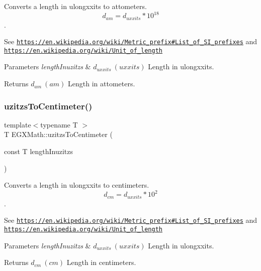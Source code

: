 Converts a length in ulongxxits to attometers. \[ d_{am}=d_{uxxits} * 10^{18} \]. 

See \href{https://en.wikipedia.org/wiki/Metric_prefix#List_of_SI_prefixes}{\tt https\+://en.\+wikipedia.\+org/wiki/\+Metric\+\_\+prefix\#\+List\+\_\+of\+\_\+\+S\+I\+\_\+prefixes} and \href{https://en.wikipedia.org/wiki/Unit_of_length}{\tt https\+://en.\+wikipedia.\+org/wiki/\+Unit\+\_\+of\+\_\+length} 
\begin{DoxyParams}{Parameters}
{\em length\+Inuzitzs} & $ d_{uxxits}\ (uxxits)$ Length in ulongxxits. \\
\hline
\end{DoxyParams}
\begin{DoxyReturn}{Returns}
$ d_{am}\ (am)$ Length in attometers. 
\end{DoxyReturn}
\mbox{\label{group___e_g_x_math-_conversions-_length_conversions-uzitzs-_s_i_ga1fb15b72a000d43348190004a49ed7bc}} 
\subsubsection{\texorpdfstring{uzitzs\+To\+Centimeter()}{uzitzsToCentimeter()}}
{\footnotesize\ttfamily template$<$typename T $>$ \\
T E\+G\+X\+Math\+::uzitzs\+To\+Centimeter (\begin{DoxyParamCaption}\item[{const T}]{length\+Inuzitzs }\end{DoxyParamCaption})}



Converts a length in ulongxxits to centimeters. \[ d_{cm}=d_{uxxits} * 10^{2} \]. 

See \href{https://en.wikipedia.org/wiki/Metric_prefix#List_of_SI_prefixes}{\tt https\+://en.\+wikipedia.\+org/wiki/\+Metric\+\_\+prefix\#\+List\+\_\+of\+\_\+\+S\+I\+\_\+prefixes} and \href{https://en.wikipedia.org/wiki/Unit_of_length}{\tt https\+://en.\+wikipedia.\+org/wiki/\+Unit\+\_\+of\+\_\+length} 
\begin{DoxyParams}{Parameters}
{\em length\+Inuzitzs} & $ d_{uxxits}\ (uxxits)$ Length in ulongxxits. \\
\hline
\end{DoxyParams}
\begin{DoxyReturn}{Returns}
$ d_{cm}\ (cm)$ Length in centimeters. 
\end{DoxyReturn}
\mbox{\label{group___e_g_x_math-_conversions-_length_conversions-uzitzs-_s_i_ga62dcf7a675d92ce74d56e67f2fed7ace}} 
